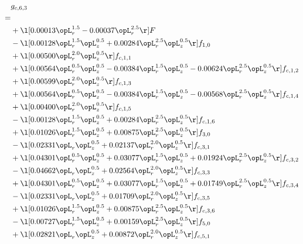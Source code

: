 \begin{alignat}{2} 
\label{eq:g_63_0} 
& g_{c,6,3} \nonumber \\ 
 = \\ 
& + \l[  0.00013 \opL_r^{1.5}   -0.00037 \opL_r^{2.5}  \r] F \nonumber \\ 
& - \l[  0.00128 \opL_r^{1.5} \opL_z^{0.5} +  0.00284 \opL_r^{2.5} \opL_z^{0.5}  \r] f_{1,0} \nonumber \\ 
& + \l[  0.00500 \opL_r^{2.0} \opL_z^{0.5}  \r] f_{c,1,1} \nonumber \\ 
& + \l[  0.00564 \opL_r^{0.5} \opL_z^{0.5}   -0.00384 \opL_r^{1.5} \opL_z^{0.5}   -0.00624 \opL_r^{2.5} \opL_z^{0.5}  \r] f_{c,1,2} \nonumber \\ 
& + \l[  0.00599 \opL_r^{2.0} \opL_z^{0.5}  \r] f_{c,1,3} \nonumber \\ 
& + \l[  0.00564 \opL_r^{0.5} \opL_z^{0.5}   -0.00384 \opL_r^{1.5} \opL_z^{0.5}   -0.00568 \opL_r^{2.5} \opL_z^{0.5}  \r] f_{c,1,4} \nonumber \\ 
& + \l[  0.00400 \opL_r^{2.0} \opL_z^{0.5}  \r] f_{c,1,5} \nonumber \\ 
& - \l[  0.00128 \opL_r^{1.5} \opL_z^{0.5} +  0.00284 \opL_r^{2.5} \opL_z^{0.5}  \r] f_{c,1,6} \nonumber \\ 
& + \l[  0.01026 \opL_r^{1.5} \opL_z^{0.5} +  0.00875 \opL_r^{2.5} \opL_z^{0.5}  \r] f_{3,0} \nonumber \\ 
& - \l[  0.02331 \opL_r \opL_z^{0.5} +  0.02137 \opL_r^{2.0} \opL_z^{0.5}  \r] f_{c,3,1} \nonumber \\ 
& + \l[  0.04301 \opL_r^{0.5} \opL_z^{0.5} +  0.03077 \opL_r^{1.5} \opL_z^{0.5} +  0.01924 \opL_r^{2.5} \opL_z^{0.5}  \r] f_{c,3,2} \nonumber \\ 
& - \l[  0.04662 \opL_r \opL_z^{0.5} +  0.02564 \opL_r^{2.0} \opL_z^{0.5}  \r] f_{c,3,3} \nonumber \\ 
& + \l[  0.04301 \opL_r^{0.5} \opL_z^{0.5} +  0.03077 \opL_r^{1.5} \opL_z^{0.5} +  0.01749 \opL_r^{2.5} \opL_z^{0.5}  \r] f_{c,3,4} \nonumber \\ 
& - \l[  0.02331 \opL_r \opL_z^{0.5} +  0.01709 \opL_r^{2.0} \opL_z^{0.5}  \r] f_{c,3,5} \nonumber \\ 
& + \l[  0.01026 \opL_r^{1.5} \opL_z^{0.5} +  0.00875 \opL_r^{2.5} \opL_z^{0.5}  \r] f_{c,3,6} \nonumber \\ 
& - \l[  0.00727 \opL_r^{1.5} \opL_z^{0.5} +  0.00159 \opL_r^{2.5} \opL_z^{0.5}  \r] f_{5,0} \nonumber \\ 
& + \l[  0.02821 \opL_r \opL_z^{0.5} +  0.00872 \opL_r^{2.0} \opL_z^{0.5}  \r] f_{c,5,1} \nonumber \\ 

\end{alignat}
